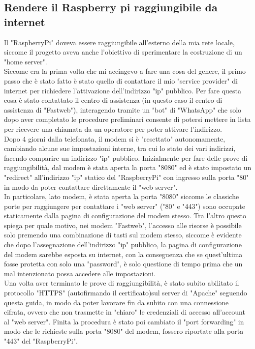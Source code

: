 \subsection{Rendere il Raspberry pi raggiungibile da internet}
Il "RaspberryPi" doveva essere raggiungibile all'esterno della mia rete locale, siccome il progetto aveva anche l'obiettivo di sperimentare la costruzione di un "home server".\\
Siccome era la prima volta che mi accingevo a fare una cosa del genere, il primo passo che è stato fatto è stato quello di contattare il mio "service provider" di internet per richiedere l'attivazione dell'indirizzo "ip" pubblico. Per fare questa cosa è stato contattato il centro di assistenza (in questo caso il centro di assistenza di "Fastweb"), interagendo tramite un "bot" di "WhatsApp" che solo dopo aver completato le procedure preliminari consente di potersi mettere in lista per ricevere una chiamata da un operatore per poter attivare l'indirizzo.\\
Dopo 4 giorni dalla telefonata, il modem si è "resettato" autonomamente, cambiando alcune sue impostazioni interne, tra cui lo stato dei vari indirizzi, facendo comparire un indirizzo "ip" pubblico. 
Inizialmente per fare delle prove di raggiungibilità, dal modem è stata aperta la porta "8080" ed è stato impostato un "redirect" all'indirizzo "ip" statico del "RaspberryPi" con ingresso sulla porta "80" in modo da poter contattare direttamente il "web server".\\
In particolare, lato modem, è stata aperta la porta "8080" siccome le classiche porte per raggiungere per contattare i "web server" ("80" e "443") sono occupate staticamente dalla pagina di configurazione del modem stesso. Tra l'altro questo spiega per quale motivo, nei modem "Fastweb", l'accesso alle risorse è possibile solo premendo una combinazione di tasti sul modem stesso, siccome è evidente che dopo l'assegnazione dell'indirizzo "ip" pubblico, la pagina di configurazione del modem sarebbe esposta su internet, con la conseguenza che se quest'ultima fosse protetta con solo una "password", è solo questione di tempo prima che un mal intenzionato possa accedere alle impostazioni.\\
Una volta aver terminato le prove di raggiungibilità, è stato subito abilitato il protocollo "HTTPS" (autofirmando il certificato)sul server di "Apache" seguendo questa \href{https://peppe8o.com/self-signed-certificate-https-in-raspberry-pi-with-apache/}{guida}, in modo da poter lavorare fin da subito con una connessione cifrata, ovvero che non trasmette in "chiaro" le credenziali di accesso all'account al "web server". Finita la procedura è stato poi cambiato il "port forwarding" in modo che le richieste sulla porta "8080" del modem, fossero riportate alla porta "443" del "RaspberryPi".\\
